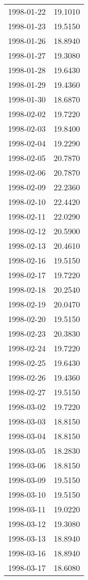 \begin{tabular}{lr}
1998-01-22 &     19.1010 \\
1998-01-23 &     19.5150 \\
1998-01-26 &     18.8940 \\
1998-01-27 &     19.3080 \\
1998-01-28 &     19.6430 \\
1998-01-29 &     19.4360 \\
1998-01-30 &     18.6870 \\
1998-02-02 &     19.7220 \\
1998-02-03 &     19.8400 \\
1998-02-04 &     19.2290 \\
1998-02-05 &     20.7870 \\
1998-02-06 &     20.7870 \\
1998-02-09 &     22.2360 \\
1998-02-10 &     22.4420 \\
1998-02-11 &     22.0290 \\
1998-02-12 &     20.5900 \\
1998-02-13 &     20.4610 \\
1998-02-16 &     19.5150 \\
1998-02-17 &     19.7220 \\
1998-02-18 &     20.2540 \\
1998-02-19 &     20.0470 \\
1998-02-20 &     19.5150 \\
1998-02-23 &     20.3830 \\
1998-02-24 &     19.7220 \\
1998-02-25 &     19.6430 \\
1998-02-26 &     19.4360 \\
1998-02-27 &     19.5150 \\
1998-03-02 &     19.7220 \\
1998-03-03 &     18.8150 \\
1998-03-04 &     18.8150 \\
1998-03-05 &     18.2830 \\
1998-03-06 &     18.8150 \\
1998-03-09 &     19.5150 \\
1998-03-10 &     19.5150 \\
1998-03-11 &     19.0220 \\
1998-03-12 &     19.3080 \\
1998-03-13 &     18.8940 \\
1998-03-16 &     18.8940 \\
1998-03-17 &     18.6080 \\

\end{tabular}
